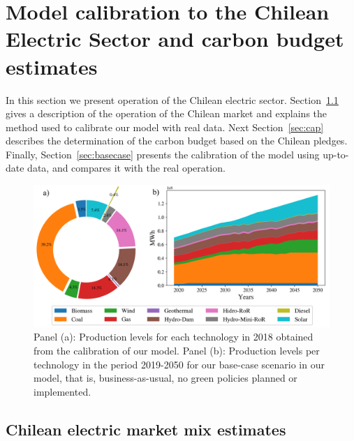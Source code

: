 \documentclass[11pt, letterpaper]{article}
\begin{document}
\section{Model calibration to the Chilean Electric Sector and carbon budget estimates}

In this section we present operation of the Chilean electric sector. Section~\ref{sec:chiledata} gives a description of the operation of the Chilean market and explains the method used to calibrate our model with real data. Next Section~\ref{sec:cap} describes the determination of the carbon budget based on the Chilean pledges. Finally, Section~\ref{sec:basecase} presents the calibration of the model using up-to-date data, and compares it with the real operation.



\begin{figure}[ht!]
 \includegraphics[width=\textwidth]{draft_paper/Figures/figure1.png}
 \caption{Panel (a): Production levels for each technology in 2018 obtained from the calibration of our model. Panel (b): Production levels per technology in the period 2019-2050 for our base-case scenario in our model, that is, business-as-usual, no green policies planned or implemented. }
  \label{fig:bc}
  \end{figure}


\subsection{Chilean electric market mix estimates}\label{sec:chiledata}
\end{document}
